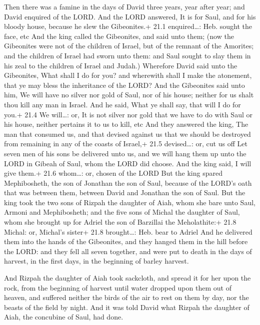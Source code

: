  Then there was a famine in the days of David three years,
year after year; and David enquired of the LORD. And the LORD answered,
It is for Saul, and for his bloody house, because he slew the
Gibeonites.+ 21.1 enquired\ldots: Heb. sought the face, etc 
And the king called the Gibeonites, and said unto them; (now the
Gibeonites were not of the children of Israel, but of the remnant of the
Amorites; and the children of Israel had sworn unto them: and Saul
sought to slay them in his zeal to the children of Israel and Judah.)
 Wherefore David said unto the Gibeonites, What shall I do
for you? and wherewith shall I make the atonement, that ye may bless the
inheritance of the LORD?  And the Gibeonites said unto him,
We will have no silver nor gold of Saul, nor of his house; neither for
us shalt thou kill any man in Israel. And he said, What ye shall say,
that will I do for you.+ 21.4 We will\ldots: or, It is not silver nor
gold that we have to do with Saul or his house, neither pertains it to
us to kill, etc  And they answered the king, The man that
consumed us, and that devised against us that we should be destroyed
from remaining in any of the coasts of Israel,+ 21.5 devised\ldots: or,
cut us off  Let seven men of his sons be delivered unto us,
and we will hang them up unto the LORD in Gibeah of Saul, whom the LORD
did choose. And the king said, I will give them.+ 21.6 whom\ldots: or,
chosen of the LORD  But the king spared Mephibosheth, the
son of Jonathan the son of Saul, because of the LORD's oath that was
between them, between David and Jonathan the son of Saul. 
But the king took the two sons of Rizpah the daughter of Aiah, whom she
bare unto Saul, Armoni and Mephibosheth; and the five sons of Michal the
daughter of Saul, whom she brought up for Adriel the son of Barzillai
the Meholathite:+ 21.8 Michal: or, Michal's sister+ 21.8 brought\ldots:
Heb. bear to Adriel  And he delivered them into the hands of
the Gibeonites, and they hanged them in the hill before the LORD: and
they fell all seven together, and were put to death in the days of
harvest, in the first days, in the beginning of barley harvest.

 And Rizpah the daughter of Aiah took sackcloth, and
spread it for her upon the rock, from the beginning of harvest until
water dropped upon them out of heaven, and suffered neither the birds of
the air to rest on them by day, nor the beasts of the field by night.
 And it was told David what Rizpah the daughter of Aiah,
the concubine of Saul, had done.

